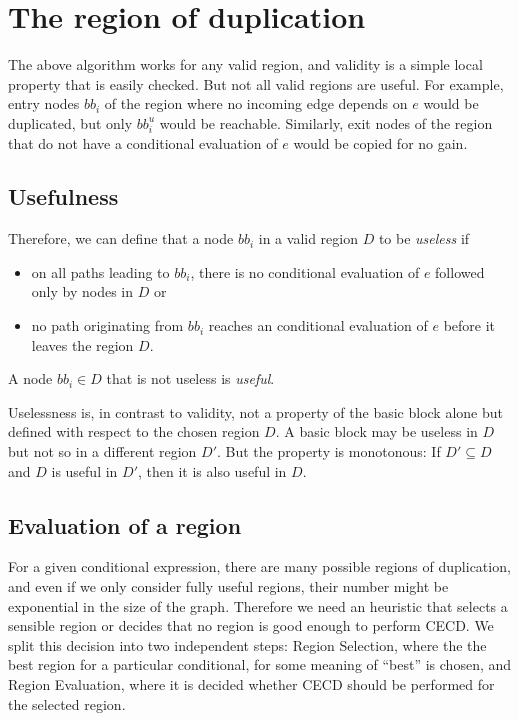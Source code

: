 \documentclass[halfparskip]{scrartcl}
\begin{document}
\section{The region of duplication}
\label{sec:region}

The above algorithm works for any valid region, and validity is a simple local property that is easily checked. But not all valid regions are useful. For example, entry nodes $bb_i$ of the region where no incoming edge depends on $e$ would be duplicated, but only $bb_i^u$ would be reachable. Similarly, exit nodes of the region that do not have a conditional evaluation of $e$ would be copied for no gain.

\subsection{Usefulness}

Therefore, we can define that a node $bb_i$ in a valid region $D$ to be \textit{useless} if
\begin{itemize}
\item on all paths leading to $bb_i$, there is no conditional evaluation of $e$ followed only by nodes in $D$ or
\item no path originating from $bb_i$ reaches an conditional evaluation of $e$ before it leaves the region $D$.
\end{itemize}

A node $bb_i\in D$ that is not useless is \textit{useful}.

Uselessness is, in contrast to validity, not a property of the basic block alone but defined with respect to the chosen region $D$. A basic block may be useless in $D$ but not so in a different region $D'$. But the property is monotonous: If $D'\subseteq D$ and $D$ is useful in $D'$, then it is also useful in $D$.

\subsection{Evaluation of a region}
\label{sec:heurisitc}

For a given conditional expression, there are many possible regions of duplication, and even if we only consider fully useful regions, their number might be exponential in the size of the graph. Therefore we need an heuristic that selects a sensible region or decides that no region is good enough to perform CECD. We split this decision into two independent steps: Region Selection, where the the best region for a particular conditional, for some meaning of “best” is chosen, and Region Evaluation, where it is decided whether CECD should be performed for the selected region.
\end{document}
